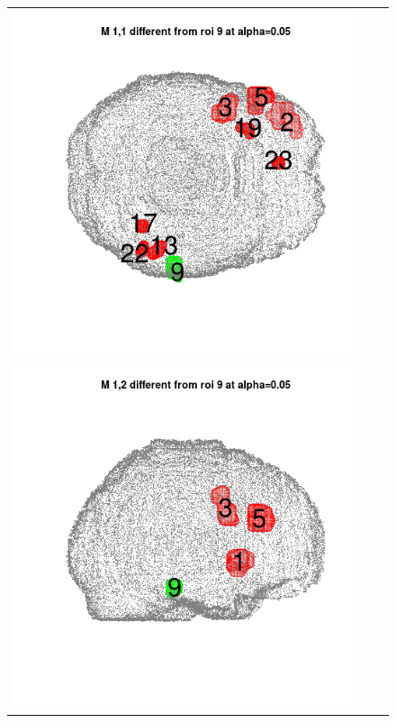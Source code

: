 \documentclass[12pt]{article}
\begin{document}
\begin{figure}[h]
\begin{tabular}{ccc}
\includegraphics[scale = 0.24]{../a7plots/d_1r_9_view3.png} \\ 
\includegraphics[scale = 0.24]{../a7plots/d_2r_9_view1.png} & 

\end{tabular}
\end{figure}
\end{document}
